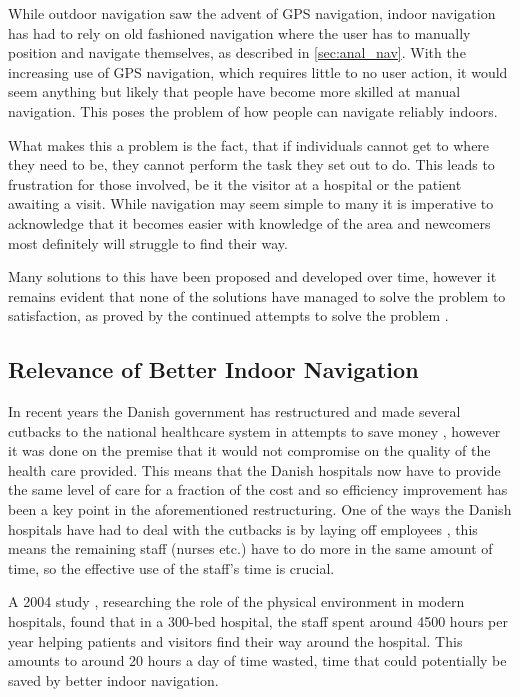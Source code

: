 While outdoor navigation saw the advent of GPS navigation, indoor navigation has had to rely on old fashioned navigation where the user has to manually position and navigate themselves, as described in \cref{sec:anal_nav}. With the increasing use of GPS navigation, which requires little to no user action, it would seem anything but likely that people have become more skilled at manual navigation. This poses the problem of how people can navigate reliably indoors.

What makes this a problem is the fact, that if individuals cannot get to where they need to be, they cannot perform the task they set out to do. This leads to frustration for those involved, be it the visitor at a hospital or the patient awaiting a visit. While navigation may seem simple to many it is imperative to acknowledge that it becomes easier with knowledge of the area and newcomers most definitely will struggle to find their way.

Many solutions to this have been proposed and developed over time, however it remains evident that none of the solutions have managed to solve the problem to satisfaction, as proved by the continued attempts to solve the problem \cite{skejby_attempt}.

\subsection{Relevance of Better Indoor Navigation}
In recent years the Danish government has restructured and made several cutbacks to the national healthcare system in attempts to save money \cite{cutback_danNHS}, however it was done on the premise that it would not compromise on the quality of the health care provided. This means that the Danish hospitals now have to provide the same level of care for a fraction of the cost and so efficiency improvement has been a key point in the aforementioned restructuring. One of the ways the Danish hospitals have had to deal with the cutbacks is by laying off employees \cite{cutback_firing}\cite{cutback_danNHS}, this means the remaining staff (nurses etc.) have to do more in the same amount of time, so the effective use of the staff's time is crucial.

A 2004 study \cite{timewaste}\cite{timewaste_report}, researching the role of the physical environment in modern hospitals, found that in a 300-bed hospital, the staff spent around 4500 hours per year helping patients and visitors find their way around the hospital. This amounts to around 20 hours a day of time wasted, time that could potentially be saved by better indoor navigation.

